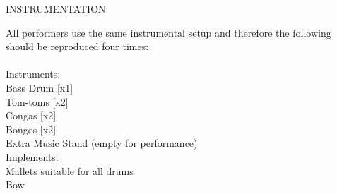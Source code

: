 \documentclass[11pt]{article}
\begin{document}
\begin{center}
\huge INSTRUMENTATION
\end{center}

All performers use the same instrumental setup and therefore the following should be reproduced four times:
\\
\\
\hspace*{1cm} Instruments:
\\
\hspace*{2cm} Bass Drum [x1]
\\
\hspace*{2cm} Tom-toms [x2]
\\
\hspace*{2cm} Congas [x2]
\\
\hspace*{2cm} Bongos [x2]
\\
\hspace*{2cm} Extra Music Stand (empty for performance)
\\
\hspace*{1cm} Implements:
\\
\hspace*{2cm} Mallets suitable for all drums
\\
\hspace*{2cm} Bow
\end{document}
